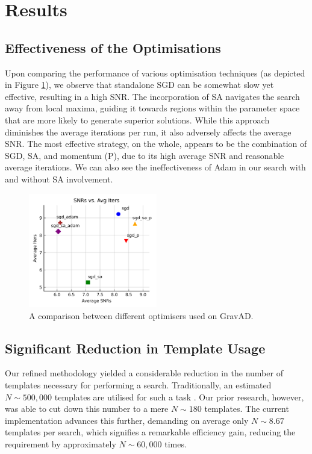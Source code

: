 \documentclass[twocolumn, aps, pra]{revtex4-2}
\begin{document}
	\section{Results} 
		
	\subsection{Effectiveness of the Optimisations}
	
	Upon comparing the performance of various optimisation techniques (as depicted in Figure \ref{fig:optims}), we observe that standalone SGD can be somewhat slow yet effective, resulting in a high SNR. The incorporation of SA navigates the search away from local maxima, guiding it towards regions within the parameter space that are more likely to generate superior solutions. While this approach diminishes the average iterations per run, it also adversely affects the average SNR. The most effective strategy, on the whole, appears to be the combination of SGD, SA, and momentum (P), due to its high average SNR and reasonable average iterations. We can also see the ineffectiveness of Adam in our search with and without SA involvement. 
	
	\begin{figure}
		\centering
		\includegraphics[width=0.5\textwidth]{optims.png}
		\caption{A comparison between different optimisers used on GravAD.}
		\label{fig:optims}
	\end{figure}
	
	\subsection{Significant Reduction in Template Usage}
	
	Our refined methodology yielded a considerable reduction in the number of templates necessary for performing a search. Traditionally, an estimated $N \sim 500,000$ templates are utilised for such a task \cite{temp_num}. Our prior research, however, was able to cut down this number to a mere $N \sim 180$ templates. The current implementation advances this further, demanding on average only $N \sim 8.67$ templates per search, which signifies a remarkable efficiency gain, reducing the requirement by approximately $N \sim 60,000$ times.
	
\end{document}
